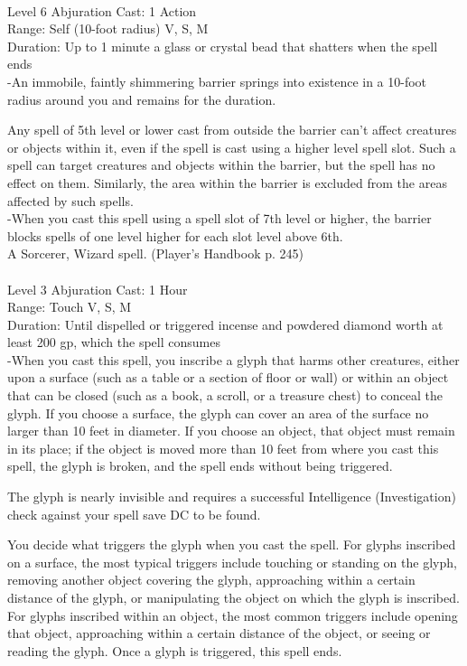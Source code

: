 \documentclass[10pt,twocolumn]{report}
\begin{document}
 \\
Level 6 \quad Abjuration \quad Cast: 1 Action\\
Range: Self (10-foot radius) \quad V, S, M\\
Duration: Up to 1 minute \quad a glass or crystal bead that shatters when the spell ends\\
-An immobile, faintly shimmering barrier springs into existence in a 10-foot radius around you and remains for the duration.

Any spell of 5th level or lower cast from outside the barrier can’t affect creatures or objects within it, even if the spell is cast using a higher level spell slot. Such a spell can target creatures and objects within the barrier, but the spell has no effect on them. Similarly, the area within the barrier is excluded from the areas affected by such spells.\\
-When you cast this spell using a spell slot of 7th level or higher, the barrier blocks spells of one level higher for each slot level above 6th.\\
A Sorcerer, Wizard spell. (Player's Handbook p. 245) \\


 \\
Level 3 \quad Abjuration \quad Cast: 1 Hour\\
Range: Touch \quad V, S, M\\
Duration: Until dispelled or triggered \quad incense and powdered diamond worth at least 200 gp, which the spell consumes\\
-When you cast this spell, you inscribe a glyph that harms other creatures, either upon a surface (such as a table or a section of floor or wall) or within an object that can be closed (such as a book, a scroll, or a treasure chest) to conceal the glyph.
If you choose a surface, the glyph can cover an area of the surface no larger than 10 feet in diameter. If you choose an object, that object must remain in its place; if the object is moved more than 10 feet from where you cast this spell, the glyph is broken, and the spell ends without being triggered.

The glyph is nearly invisible and requires a successful Intelligence (Investigation) check against your spell save DC to be found.

You decide what triggers the glyph when you cast the spell. For glyphs inscribed on a surface, the most typical triggers include touching or standing on the glyph, removing another object covering the glyph, approaching within a certain distance of the glyph, or manipulating the object on which the glyph is inscribed. For glyphs inscribed within an object, the most common triggers include opening that object, approaching within a certain distance of the object, or seeing or reading the glyph. Once a glyph is triggered, this spell ends.
\end{document}
